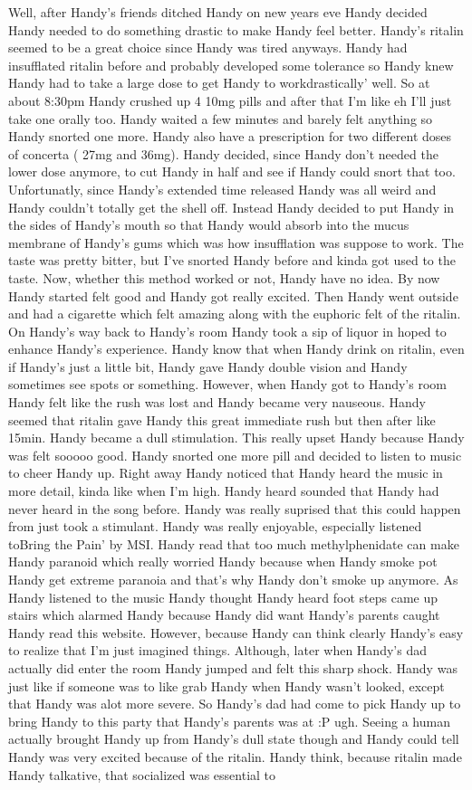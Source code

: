 \documentclass[12pt]{book}
\begin{document}
Well, after Handy's friends ditched Handy on new years eve Handy decided Handy needed to do something drastic to make Handy feel better. Handy's ritalin seemed to be a great choice since Handy was tired anyways. Handy had insufflated ritalin before and probably developed some tolerance so Handy knew Handy had to take a large dose to get Handy to workdrastically' well. So at about 8:30pm Handy crushed up 4 10mg pills and after that I'm like eh I'll just take one orally too. Handy waited a few minutes and barely felt anything so Handy snorted one more. Handy also have a prescription for two different doses of concerta ( 27mg and 36mg). Handy decided, since Handy don't needed the lower dose anymore, to cut Handy in half and see if Handy could snort that too. Unfortunatly, since Handy's extended time released Handy was all weird and Handy couldn't totally get the shell off. Instead Handy decided to put Handy in the sides of Handy's mouth so that Handy would absorb into the mucus membrane of Handy's gums which was how insufflation was suppose to work. The taste was pretty bitter, but I've snorted Handy before and kinda got used to the taste. Now, whether this method worked or not, Handy have no idea. By now Handy started felt good and Handy got really excited. Then Handy went outside and had a cigarette which felt amazing along with the euphoric felt of the ritalin. On Handy's way back to Handy's room Handy took a sip of liquor in hoped to enhance Handy's experience. Handy know that when Handy drink on ritalin, even if Handy's just a little bit, Handy gave Handy double vision and Handy sometimes see spots or something. However, when Handy got to Handy's room Handy felt like the rush was lost and Handy became very nauseous. Handy seemed that ritalin gave Handy this great immediate rush but then after like 15min. Handy became a dull stimulation. This really upset Handy because Handy was felt sooooo good. Handy snorted one more pill and decided to listen to music to cheer Handy up. Right away Handy noticed that Handy heard the music in more detail, kinda like when I'm high. Handy heard sounded that Handy had never heard in the song before. Handy was really suprised that this could happen from just took a stimulant. Handy was really enjoyable, especially listened toBring the Pain' by MSI. Handy read that too much methylphenidate can make Handy paranoid which really worried Handy because when Handy smoke pot Handy get extreme paranoia and that's why Handy don't smoke up anymore. As Handy listened to the music Handy thought Handy heard foot steps came up stairs which alarmed Handy because Handy did want Handy's parents caught Handy read this website. However, because Handy can think clearly Handy's easy to realize that I'm just imagined things. Although, later when Handy's dad actually did enter the room Handy jumped and felt this sharp shock. Handy was just like if someone was to like grab Handy when Handy wasn't looked, except that Handy was alot more severe. So Handy's dad had come to pick Handy up to bring Handy to this party that Handy's parents was at :P ugh. Seeing a human actually brought Handy up from Handy's dull state though and Handy could tell Handy was very excited because of the ritalin. Handy think, because ritalin made Handy talkative, that socialized was essential to 
\end{document}
